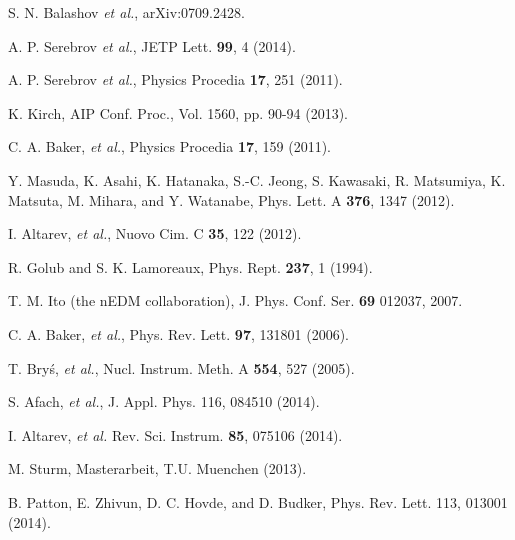 \documentclass[review]{elsarticle}
\begin{document}

\begin{thebibliography}{00}

 S. N. Balashov {\it et al.}, arXiv:0709.2428.

 A. P. Serebrov {\it et al.}, JETP Lett. {\bf 99}, 4
  (2014).

 A. P. Serebrov {\it et al.}, Physics Procedia {\bf
  17}, 251 (2011).

 K. Kirch, AIP Conf. Proc., Vol. 1560, pp. 90-94
  (2013).

 C. A. Baker, {\it et al.}, Physics Procedia {\bf
  17}, 159 (2011).

 Y. Masuda, K. Asahi, K. Hatanaka, S.-C. Jeong,
  S. Kawasaki, R. Matsumiya, K. Matsuta, M. Mihara, and Y. Watanabe,
  Phys. Lett. A {\bf 376}, 1347 (2012).

 I. Altarev, {\it et al.}, Nuovo Cim. C {\bf
  35}, 122 (2012).

 R. Golub and S. K. Lamoreaux, Phys. Rept.  {\bf
  237}, 1 (1994).

 T. M. Ito (the nEDM collaboration),
  J. Phys. Conf. Ser. {\bf 69} 012037, 2007.

 C. A. Baker, {\it et al.}, Phys. Rev. Lett. {\bf
  97}, 131801 (2006).

 T. Bry\'s, {\it et al.}, Nucl. Instrum. Meth. A
  {\bf 554}, 527 (2005).

 S. Afach, {\it et al.}, J. Appl. Phys. 116, 084510 (2014).

 I. Altarev, {\it et al.}
  Rev. Sci. Instrum. {\bf 85}, 075106 (2014).

 M. Sturm, Masterarbeit, T.U. Muenchen (2013).

 B. Patton, E. Zhivun, D. C. Hovde, and D. Budker,
  Phys. Rev. Lett. 113, 013001 (2014).
\end{thebibliography}
\end{document}
